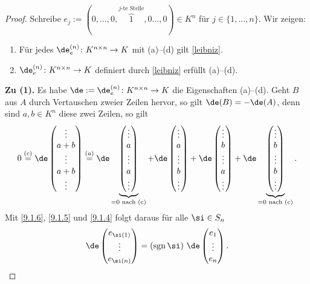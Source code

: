 \documentclass[../../main.tex]{subfiles}
\begin{document}
\begin{proof}
Schreibe $e_j:=(0,\dots,0,\overbrace1^{\text{$j$-te Stelle}},0\dots,0)\in K^n$ für $j\in\{1,\dots,n\}$. Wir zeigen:
\begin{enumerate}[(1)]
\item Für jedes $\de_e^{(n)}\colon K^{n\times n}\to K$ mit (a)--(d) gilt \eqref{leibniz}.
\item $\de_e^{(n)}\colon K^{n\times n}\to K$ definiert durch \eqref{leibniz} erfüllt (a)--(d).
\end{enumerate}
\textbf{Zu (1).} Es habe $\de:=\de_e^{(n)}\colon K^{n\times n}\to K$ die Eigenschaften (a)--(d). Geht $B$ aus $A$ durch Vertauschen zweier Zeilen hervor,
so gilt $\de(B)=-\de(A)$, denn sind $a,b\in K^n$ diese zwei Zeilen, so gilt
\[0\overset{(c)}=\de\begin{pmatrix}\vdots\\a+b\\\vdots\\a+b\\\vdots\end{pmatrix}\overset{(a)}=
\de\underbrace{\begin{pmatrix}\vdots\\a\\\vdots\\a\\\vdots\end{pmatrix}}_{=0 \text{ nach (c)}}+
\de\begin{pmatrix}\vdots\\a\\\vdots\\b\\\vdots\end{pmatrix}+
\de\begin{pmatrix}\vdots\\b\\\vdots\\a\\\vdots\end{pmatrix}+
\de\underbrace{\begin{pmatrix}\vdots\\b\\\vdots\\b\\\vdots\end{pmatrix}}_{=0 \text{ nach (c)}}.\]
Mit \ref{9.1.6}, \ref{9.1.5} und \ref{9.1.4} folgt daraus für alle $\si\in S_n$
\[\de\begin{pmatrix}e_{\si(1)}\\\vdots\\e_{\si(n)}\end{pmatrix}=(\sgn\si)~\de\begin{pmatrix}e_1\\\vdots\\e_n\end{pmatrix}.\]

\end{proof}
\end{document}
